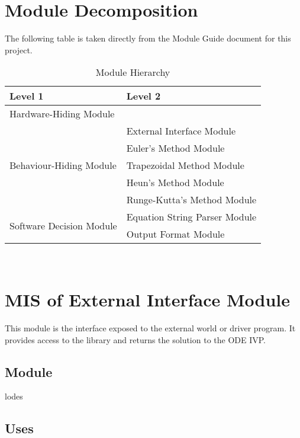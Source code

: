\documentclass[12pt, titlepage]{article}
\begin{document}
\section{Module Decomposition}

The following table is taken directly from the Module Guide document for this project.

\begin{table}[h!]
\centering
\begin{tabular}{p{} p{}}
\toprule
\textbf{Level 1} & \textbf{Level 2}\\
\midrule

{Hardware-Hiding Module} & ~ \\
\midrule

\multirow{5}{0.3\textwidth}{Behaviour-Hiding Module} & External Interface Module\\
& Euler's Method Module\\
& Trapezoidal Method Module\\
& Heun's Method Module\\
& Runge-Kutta's Method Module\\
\midrule

\multirow{2}{0.3\textwidth}{Software Decision Module} & {Equation String Parser Module}\\
& Output Format Module\\
\bottomrule

\end{tabular}
\caption{Module Hierarchy}
\label{TblMH}
\end{table}

\newpage
~\newpage

\section{MIS of External Interface Module} \label{modExternalInterface}
This module is the interface exposed to the external world or driver program.
It provides access to the library and returns the solution to the ODE IVP.

\subsection{Module}
lodes


\subsection{Uses}
\end{document}
